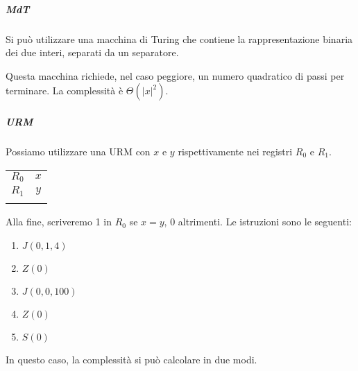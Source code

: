 \subparagraph{MdT} Si può utilizzare una macchina di Turing che contiene la rappresentazione binaria dei due interi, separati da un separatore.
\begin{center}
\end{center}
Questa macchina richiede, nel caso peggiore, un numero quadratico di passi per terminare. La com\-ples\-si\-tà è $\Theta(|x|^2)$.

\subparagraph{URM} Possiamo utilizzare una URM con $x$ e $y$ rispettivamente nei registri $R_0$ e $R_1$.
\begin{table}[H]
    \centering
    \begin{tabular}{c|c|}
    \cline{2-2}
    $R_0$ & $x$ \\ \cline{2-2} 
    $R_1$ & $y$ \\ \cline{2-2} 
          &    
    \end{tabular}
\end{table}
\noindent Alla fine, scriveremo 1 in $R_0$ se $x=y$, 0 altrimenti. Le istruzioni sono le seguenti:
\begin{enumerate}
    \item $J(0,1,4)$
    \item $Z(0)$
    \item $J(0,0,100)$
    \item $Z(0)$
    \item $S(0)$
\end{enumerate}
In questo caso, la complessità si può calcolare in due modi.

